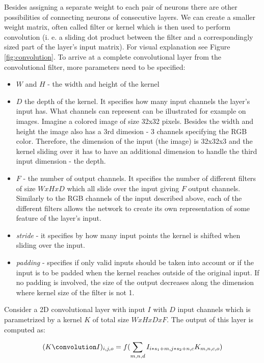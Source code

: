 Besides assigning a separate weight to each pair of neurons there are other possibilities of connecting neurons of consecutive layers.
We can create a smaller weight matrix, often called filter or kernel which is then used to perform convolution (i. e. a sliding dot product between the filter and a correspondingly sized part of the layer's input matrix). 
For visual explanation see Figure \ref{fig:convolution}.
To arrive at a complete convolutional layer from the convolutional filter, more parameters need to be specified:
\begin{itemize}
    \item $W$  and $H$ - the width and height of the kernel
    \item $D$ the depth of the kernel. 
    It specifies how many input channels the layer's input has.
    What channels can represent can be illustrated for example on images.
    Imagine a colored image of size 32x32 pixels.
    Besides the width and height the image also has a 3rd dimesion - 3 channels specifying the RGB color.
    Therefore, the dimension of the input (the image) is 32x32x3 and the kernel sliding over it has to have an additional dimension to handle the third input dimension - the depth.
    \item $F$ - the number of output channels. 
    It specifies the number of different filters of size $WxHxD$ which all slide over the input giving $F$ output channels. 
    Similarly to the RGB channels of the input described above, each of the different filters allows the network to create its own representation of some feature of the layer's input.    
    \item \textit{stride} - it specifies by how many input points the kernel is shifted when sliding over the input. 
    \item \textit{padding} - specifies if only valid inputs should be taken into account or if the input is to be padded when the kernel reaches outside of the original input.
    If no padding is involved, the size of the output decreases along the dimension where kernel size of the filter is not 1.
\end{itemize}

Consider a 2D convolutional layer with input $I$ with $D$ input channels which is parametrized by a kernel $K$ of total size $WxHxDxF$. The output of this layer is computed as:

\begin{equation}
    (K \convolution I)_{i,j,o} = f(\sum_{m,n,d} I_{i*s_1+m,j*s_2+n,c} K_{m,n,c,o})
\end{equation}\label{eq:convolution}


